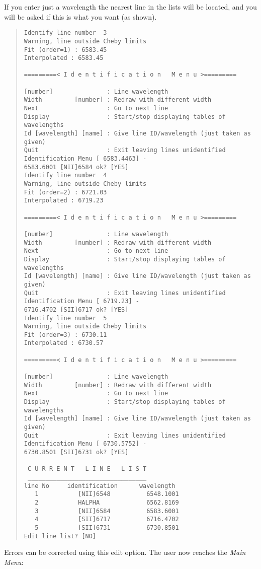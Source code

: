 If you enter just a wavelength the nearest line in the lists will be
located, and you will be asked if this is what you want (as shown).

\begin{quote}\begin{verbatim}
Identify line number  3
Warning, line outside Cheby limits
Fit (order=1) : 6583.45
Interpolated : 6583.45
 
=========< I d e n t i f i c a t i o n   M e n u >=========
 
[number]               : Line wavelength
Width         [number] : Redraw with different width
Next                   : Go to next line
Display                : Start/stop displaying tables of wavelengths
Id [wavelength] [name] : Give line ID/wavelength (just taken as given)
Quit                   : Exit leaving lines unidentified
Identification Menu [ 6583.4463] -
6583.6001 [NII]6584 ok? [YES]
Identify line number  4
Warning, line outside Cheby limits
Fit (order=2) : 6721.03
Interpolated : 6719.23
 
=========< I d e n t i f i c a t i o n   M e n u >=========
 
[number]               : Line wavelength
Width         [number] : Redraw with different width
Next                   : Go to next line
Display                : Start/stop displaying tables of wavelengths
Id [wavelength] [name] : Give line ID/wavelength (just taken as given)
Quit                   : Exit leaving lines unidentified
Identification Menu [ 6719.23] -
6716.4702 [SII]6717 ok? [YES]
Identify line number  5
Warning, line outside Cheby limits
Fit (order=3) : 6730.11
Interpolated : 6730.57
 
=========< I d e n t i f i c a t i o n   M e n u >=========
 
[number]               : Line wavelength
Width         [number] : Redraw with different width
Next                   : Go to next line
Display                : Start/stop displaying tables of wavelengths
Id [wavelength] [name] : Give line ID/wavelength (just taken as given)
Quit                   : Exit leaving lines unidentified
Identification Menu [ 6730.5752] -
6730.8501 [SII]6731 ok? [YES]
 
 C U R R E N T   L I N E   L I S T
 _________________________________
line No     identification      wavelength
   1           [NII]6548          6548.1001
   2           HALPHA             6562.8169
   3           [NII]6584          6583.6001
   4           [SII]6717          6716.4702
   5           [SII]6731          6730.8501
Edit line list? [NO]
\end{verbatim}\end{quote}
Errors can be corrected using this edit option.
The user now reaches the {\it Main Menu}:

